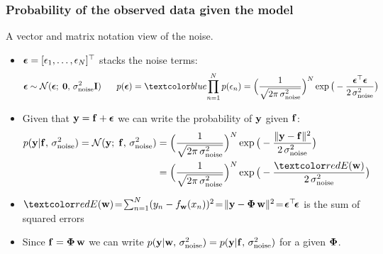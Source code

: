 \begin{frame}
\frametitle{Probability of the observed data given the model}

A vector and matrix notation view of the noise.
\begin{itemize}
\item $\boldsymbol{\epsilon}=[\epsilon_1,\ldots,\epsilon_N]^\top$ stacks the  noise terms:
%
\[
\bepsilon\sim\N(\bepsilon;\;\mathbf{0},\,\sigma_\mathrm{noise}^2\bfI)
\hspace{4ex}
p(\bepsilon)=\Blue{\prod_{n=1}^N p(\epsilon_n)}=
\Big(\frac{1}{\sqrt{2\pi\,\sigma_\mathrm{noise}^2}}\Big)^N
\exp{\big(-\frac{\bepsilon^\top\bepsilon}{2\,\sigma_\mathrm{noise}^2}\big)}
\]
% 
\item Given that $\mathbf y=\mathbf f+\boldsymbol{\epsilon}$ we can write the probability of $\mathbf y$ given $\mathbf f$:
%
\begin{align*}
p(\bfy|\bff,\,\sigma_\mathrm{noise}^2)=\N(\bfy;\;\bff,\,\sigma_\mathrm{noise}^2)
&=\Big(\frac{1}{\sqrt{2\pi\,\sigma_\mathrm{noise}^2}}\Big)^N
\exp{\big(-\frac{\|\bfy-\bff\|^2}{2\,\sigma_\mathrm{noise}^2}\big)}\\
&=\Big(\frac{1}{\sqrt{2\pi\,\sigma_\mathrm{noise}^2}}\Big)^N
\exp{\big(-\frac{\Red{E(\bfw)}}{2\,\sigma_\mathrm{noise}^2}\big)}
\end{align*}
%
\item
  $\Red{E(\bfw)}\!=\!\sum_{n=1}^N(y_n-f_\bfw(x_n))^2\!=\!\|\bfy-\bPhi\,\bfw\|^2
  \!= \!\bepsilon^\top\!\bepsilon$ is the sum of squared 
errors
\item Since $\mathbf f=\boldsymbol{\Phi}\,\mathbf w$ we can write 
$p(\mathbf y|\mathbf w,\,\sigma_\mathrm{noise}^2)=p(\mathbf y|\mathbf f,\,\sigma_\mathrm{noise}^2)$ for a given $\boldsymbol{\Phi}$.
\end{itemize}
\end{frame}


